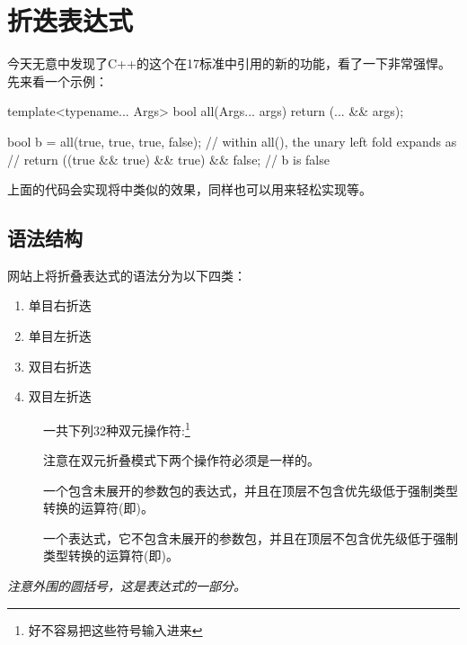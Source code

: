 \chapter{折迭表达式}
今天无意中发现了C++的这个在17标准中引用的新的功能，看了一下非常强悍。先来看一个示例：
\begin{cpplst}
template<typename... Args>
bool all(Args... args) { return (... && args); }

bool b = all(true, true, true, false);
// within all(), the unary left fold expands as
//  return ((true && true) && true) && false;
// b is false
\end{cpplst}
上面的代码会实现将中类似的效果，同样也可以用来轻松实现等。

\section{语法结构}
网站上将折叠表达式的语法分为以下四类：
\begin{enumerate}
	\item {} 单目右折迭
	\item {} 单目左折迭
	\item {} 双目右折迭
	\item {} 双目左折迭
\end{enumerate}

\begin{description}
	\item[] 一共下列32种双元操作符:\footnote{好不容易把这些符号输入进来}



	      注意在双元折叠模式下两个操作符必须是一样的。
	\item[] 一个包含未展开的参数包的表达式，并且在顶层不包含优先级低于强制类型转换的运算符(即)。
	\item[]
	      一个表达式，它不包含未展开的参数包，并且在顶层不包含优先级低于强制类型转换的运算符(即)。
\end{description}
\emph{注意外围的圆括号，这是表达式的一部分。}

